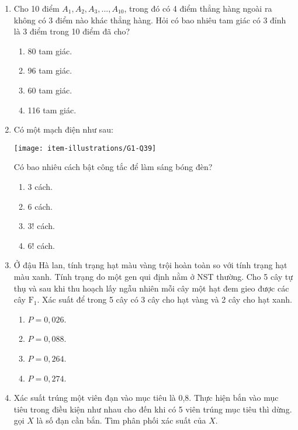 \begin{enumerate}[label=\textbf{Câu \arabic*.},align=left,left=0cm..0cm,itemindent=*]
\begin{multicols}{4}
\begin{enumerate}[label=\textbf{\Alph*.},align=left,left=1cm..0cm,itemindent=*]
	\end{enumerate}\end{multicols}
	\item Cho 10 điểm $A_1, A_2, A_3,..., A_{10}$, trong đó có 4 điểm thẳng hàng ngoài ra không có 3 điểm nào khác thẳng hàng. Hỏi có bao nhiêu tam giác có 3 đỉnh là 3 điểm trong 10 điểm đã cho?
	\begin{enumerate}[label=\textbf{\Alph*.},align=left,left=1cm..0cm,itemindent=*]
		\item 80 tam giác. \item 96 tam giác. \item 60 tam giác. \item 116 tam giác.
	\end{enumerate}
	\item Có một mạch điện như sau:\par
	{\centering\texttt{[image: item-illustrations/G1-Q39]}\par}
	Có bao nhiêu cách bật công tắc để làm sáng bóng đèn?
	\begin{multicols}{4}\begin{enumerate}[label=\textbf{\Alph*.},align=left,left=1cm..0cm,itemindent=*]
		\item 3 cách. \item 6 cách. \item $3!$ cách. \item $6!$ cách.
	\end{enumerate}\end{multicols}
	\item Ở đậu Hà lan, tính trạng hạt màu vàng trội hoàn toàn so với tính trạng hạt màu xanh. Tính trạng do một gen qui định nằm ở NST thường. Cho 5 cây tự thụ và sau khi thu hoạch lấy ngẫu nhiên mỗi cây một hạt đem gieo được các cây $\text{F}_1$. Xác suất để trong 5 cây có 3 cây cho hạt vàng và 2 cây cho hạt xanh.
	\begin{enumerate}[label=\textbf{\Alph*.},align=left,left=1cm..0cm,itemindent=*]
		\item $P=0,026$. \item $P=0,088$. \item $P=0,264$. \item $P=0,274$.
	\end{enumerate}
	\item Xác suất trúng một viên đạn vào mục tiêu là 0,8. Thực hiện bắn vào mục tiêu trong điều kiện như nhau cho đến khi có 5 viên trúng mục tiêu thì dừng. gọi $X$ là số đạn cần bắn. Tìm phân phối xác suất của $X$.
	\begin{enumerate}[label=\textbf{\Alph*.},align=left,left=1cm..0cm,itemindent=*]

\end{enumerate}
\end{enumerate}
